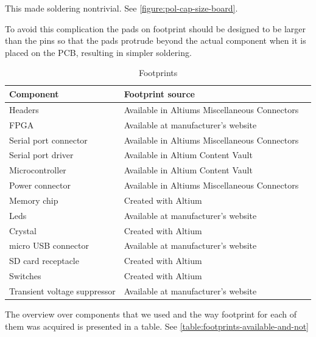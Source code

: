 This made soldering nontrivial.
See \vref{figure:pol-cap-size-board}.

To avoid this complication the pads on footprint should be designed to be larger than the pins so that the pads protrude beyond the actual component when it is placed on the PCB, resulting in simpler soldering.

 \begin{table}[H]
 \begin{center}
 \begin{tabular}{| l | l | l |}
 \hline
 Component & Footprint source\\
 \hline
 Headers & Available in Altiums Miscellaneous Connectors \\
 FPGA & Available at manufacturer's website \\
 Serial port connector & Available in Altiums Miscellaneous Connectors \\
 Serial port driver & Available in Altium Content Vault \\
 Microcontroller & Available in Altium Content Vault \\
 Power connector &  Available in Altiums Miscellaneous Connectors\\
 Memory chip & Created with Altium \\
 Leds &  Available at manufacturer's website\\
 Crystal &  Created with Altium \\
 micro USB connector & Available at manufacturer's website \\
 SD card receptacle & Created with Altium \\
 Switches & Created with Altium \\
 Transient voltage suppressor & Available at manufacturer's website \\
 \hline
 \end{tabular}
 \caption{Footprints}
 \label{table:footprints-available-and-not}
 \end{center}
 \end{table}


The overview over components that we used and the way footprint for each of them was acquired is presented in a table. See \vref{table:footprints-available-and-not}